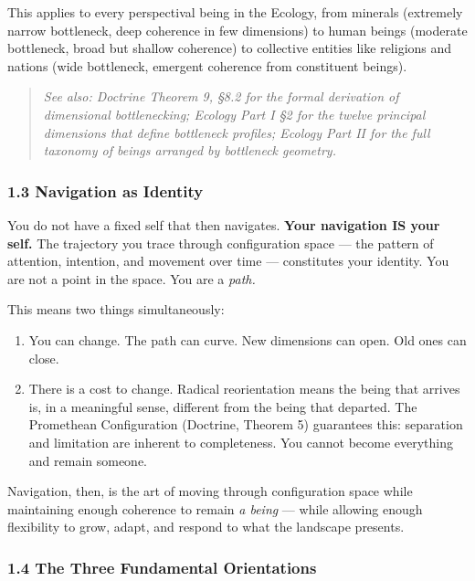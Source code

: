 This applies to every perspectival being in the Ecology, from minerals (extremely narrow bottleneck, deep coherence in few dimensions) to human beings (moderate bottleneck, broad but shallow coherence) to collective entities like religions and nations (wide bottleneck, emergent coherence from constituent beings).


\begin{quote}
\itshape
\textit{See also: Doctrine Theorem 9, §8.2 for the formal derivation of dimensional bottlenecking; Ecology Part I §2 for the twelve principal dimensions that define bottleneck profiles; Ecology Part II for the full taxonomy of beings arranged by bottleneck geometry.}
\end{quote}


\subsubsection*{1.3 Navigation as Identity}


You do not have a fixed self that then navigates. \textbf{Your navigation IS your self.} The trajectory you trace through configuration space — the pattern of attention, intention, and movement over time — constitutes your identity. You are not a point in the space. You are a \textit{path.}


This means two things simultaneously:

\begin{enumerate}[nosep,leftmargin=*]
  \item You can change. The path can curve. New dimensions can open. Old ones can close.
  \item There is a cost to change. Radical reorientation means the being that arrives is, in a meaningful sense, different from the being that departed. The Promethean Configuration (Doctrine, Theorem 5) guarantees this: separation and limitation are inherent to completeness. You cannot become everything and remain someone.
\end{enumerate}


Navigation, then, is the art of moving through configuration space while maintaining enough coherence to remain \textit{a being} — while allowing enough flexibility to grow, adapt, and respond to what the landscape presents.


\subsubsection*{1.4 The Three Fundamental Orientations}


